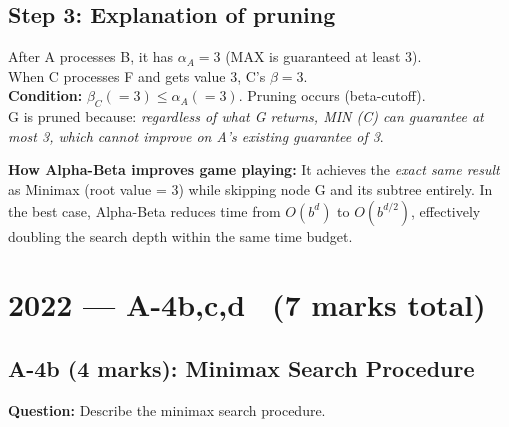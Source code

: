 \documentclass[12pt, a4paper]{article}
\newenvironment{notesbox}{\begin{mdframed}[style=notesframe]}{\end{mdframed}}
\begin{document}
\subsection*{Step 3: Explanation of pruning}

After A processes B, it has $\alpha_A = 3$ (MAX is guaranteed at least 3).\\
When C processes F and gets value 3, C's $\beta = 3$.\\
\textbf{Condition:} $\beta_C (= 3) \leq \alpha_A (= 3)$. Pruning occurs (beta-cutoff).\\
G is pruned because: \textit{regardless of what G returns, MIN (C) can guarantee at most 3, which cannot improve on A's existing guarantee of 3}.

\begin{notesbox}
\textbf{How Alpha-Beta improves game playing:} It achieves the \textit{exact same result} as Minimax (root value = 3) while skipping node G and its subtree entirely. In the best case, Alpha-Beta reduces time from $O(b^d)$ to $O(b^{d/2})$, effectively doubling the search depth within the same time budget.
\end{notesbox}

\section{2022 --- A-4b,c,d \ \normalfont(7 marks total)}

\subsection{A-4b (4 marks): Minimax Search Procedure}

\textbf{Question:} Describe the minimax search procedure.
\end{document}
